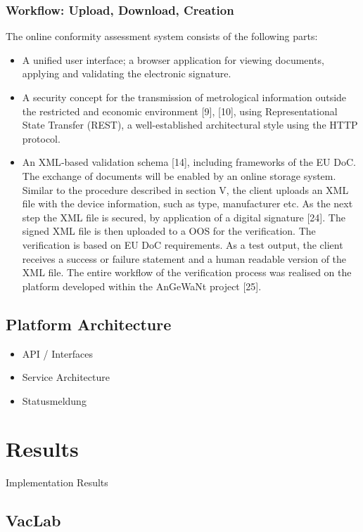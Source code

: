 \documentclass[3p,times,procedia]{elsarticle}
\begin{document}
\subsubsection{Workflow: Upload, Download, Creation}
The online conformity assessment system consists of the following parts:
\begin{itemize}
    
\item A unified user interface; a browser application for viewing documents, applying and validating the electronic signature.
\item A security concept for the transmission of metrological information outside the restricted and economic environment [9], [10], using Representational State Transfer (REST), a well-established architectural style using the HTTP protocol.
\item An XML‐based validation schema [14], including frameworks of the EU DoC. The exchange of documents will be enabled by an online storage system. 
Similar to the procedure described in section V, the client uploads an XML file with the device information, such as type, manufacturer etc. As the next step the XML file is secured, by application of a digital signature [24]. The signed XML file is then uploaded to a OOS for the verification. The verification is based on EU DoC requirements. As a test output, the client receives a success or failure statement and a human readable version of the XML file. The entire workflow of the verification process was realised on the platform developed within the AnGeWaNt project [25].
\end{itemize}

\subsection{Platform Architecture}
\begin{itemize}
    \item API / Interfaces 
    \item Service Architecture 
    \item Statusmeldung
\end{itemize}


\section{Results}
Implementation Results

\subsection{VacLab}
\end{document}
